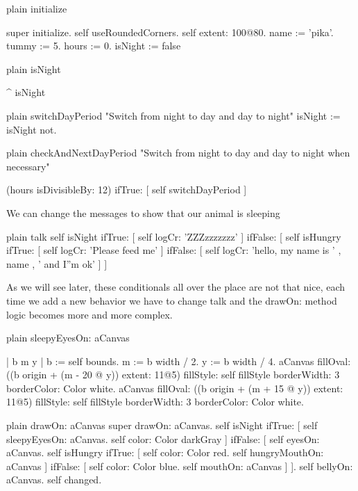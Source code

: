 \documentclass[10pt,twoside,english]{_support/latex/sbabook/sbabook}
\begin{document}
\begin{displaycode}{plain}
initialize

	super initialize. 
	self useRoundedCorners.
	self extent: 100@80.
	name := 'pika'.
	tummy := 5.
	hours := 0.
	isNight := false
\end{displaycode}

\begin{displaycode}{plain}
isNight

	^ isNight
\end{displaycode}

\begin{displaycode}{plain}
switchDayPeriod
	"Switch from night to day and day to night"
	isNight := isNight not.
\end{displaycode}

\begin{displaycode}{plain}
checkAndNextDayPeriod
	"Switch from night to day and day to night when necessary" 

	(hours isDivisibleBy: 12)
		ifTrue: [ self switchDayPeriod ]
\end{displaycode}

We can change the messages to show that our animal is sleeping

\begin{displaycode}{plain}
talk
	self isNight
		ifTrue: [ self logCr: 'ZZZzzzzzzz' ]
		ifFalse: [ 
			self isHungry
				ifTrue: [ self logCr: 'Please feed me' ]
				ifFalse: [ self logCr: 'hello, my name is ' , name , ' and I''m ok' ] ]
\end{displaycode}

As we will see later, these conditionals all over the place are not that nice, each time we
add a new behavior we have to change talk and the drawOn: method logic becomes more and more complex. 

\begin{displaycode}{plain}
sleepyEyesOn: aCanvas

	| b m y |
	b := self bounds.
	m := b width / 2.
	y := b width / 4.
	aCanvas 
			fillOval: ((b origin   + (m - 20 @ y)) extent: 11@5)
			fillStyle: self fillStyle 
			borderWidth: 3
			borderColor: Color white.
	aCanvas 
			fillOval: ((b origin   + (m + 15 @ y)) extent: 11@5)
			fillStyle: self fillStyle 
			borderWidth: 3
			borderColor: Color white.
\end{displaycode}

\begin{displaycode}{plain}
drawOn: aCanvas
	super drawOn: aCanvas.
	self isNight
		ifTrue: [ 
				self sleepyEyesOn: aCanvas.
				self color: Color darkGray ]
		ifFalse: [ 
			self eyesOn: aCanvas.
			self isHungry
				ifTrue: [ 
					self color: Color red.
					self hungryMouthOn: aCanvas ]
				ifFalse: [ 
					self color: Color blue.
					self mouthOn: aCanvas ] ].
	self bellyOn: aCanvas.
	self changed.
\end{displaycode}
\end{document}
